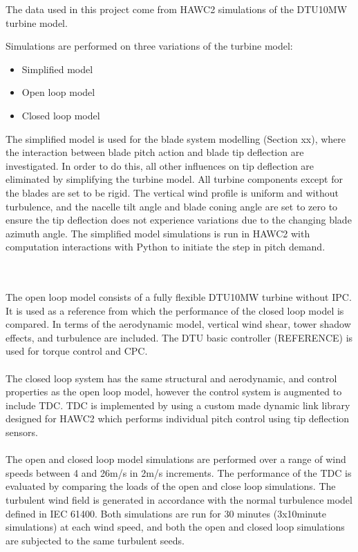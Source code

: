 The data used in this project come from HAWC2 simulations of the DTU10MW turbine model. 

Simulations are performed on three variations of the turbine model:
\begin{itemize}
    \item Simplified model
    \item Open loop model
    \item Closed loop model
\end{itemize}

The simplified model is used for the blade system modelling (Section xx), where the interaction between blade pitch action and blade tip deflection are investigated. In order to do this, all other influences on tip deflection are eliminated by simplifying the turbine model. All turbine components except for the blades are set to be rigid. The vertical wind profile is uniform and without turbulence, and the nacelle tilt angle and blade coning angle are set to zero to ensure the tip deflection does not experience variations due to the changing blade azimuth angle. The simplified model simulations is run in HAWC2 with computation interactions with Python to initiate the step in pitch demand.

\\~\\
The open loop model consists of a fully flexible DTU10MW turbine without IPC. It is used as a reference from which the performance of the closed loop model is compared. In terms of the aerodynamic model, vertical wind shear, tower shadow effects, and turbulence are included. The DTU basic controller (REFERENCE) is used for torque control and CPC. 
\\~\\
The closed loop system has the same structural and aerodynamic, and control properties as the open loop model, however the control system is augmented to include TDC. TDC is implemented by using a custom made dynamic link library designed for HAWC2 which performs individual pitch control using tip deflection sensors.
\\~\\
The open and closed loop model simulations are performed over a range of wind speeds between 4 and 26m/s in 2m/s increments. The performance of the TDC is evaluated by comparing the loads of the open and close loop simulations. The turbulent wind field is generated in accordance with the normal turbulence model defined in IEC 61400. Both simulations are run for 30 minutes (3x10minute simulations) at each wind speed, and both the open and closed loop simulations are subjected to the same turbulent seeds. 

